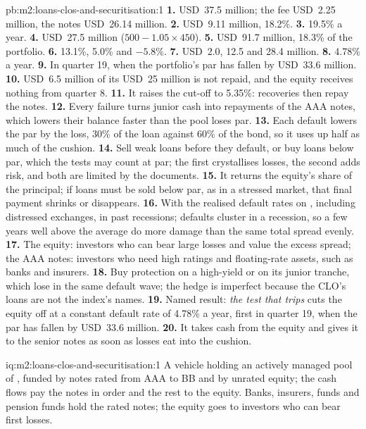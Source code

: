 \begin{solution}{pb:m2:loans-clos-and-securitisation:1}
\textbf{1.} USD~37.5 million; the fee USD~2.25 million, the notes USD~26.14 million.
\textbf{2.} USD~9.11 million, 18.2\%.
\textbf{3.} 19.5\% a year.
\textbf{4.} USD~27.5 million ($500 - 1.05 \times 450$).
\textbf{5.} USD~91.7 million, 18.3\% of the portfolio.
\textbf{6.} 13.1\%, 5.0\% and $-5.8\%$.
\textbf{7.} USD~2.0, 12.5 and 28.4 million.
\textbf{8.} 4.78\% a year.
\textbf{9.} In quarter 19, when the portfolio's par has fallen by USD~33.6 million.
\textbf{10.} USD~6.5 million of its USD~25 million is not repaid, and the equity receives
nothing from quarter 8.
\textbf{11.} It raises the cut-off to 5.35\%: recoveries then repay the notes.
\textbf{12.} Every failure turns junior cash into repayments of the AAA notes, which
lowers their balance faster than the pool loses par.
\textbf{13.} Each default lowers the par by the loss, 30\% of the loan against 60\% of
the bond, so it uses up half as much of the cushion.
\textbf{14.} Sell weak loans before they default, or buy loans below par, which the
tests may count at par; the first crystallises losses, the second adds risk, and
both are limited by the documents.
\textbf{15.} It returns the equity's share of the principal; if loans must be sold
below par, as in a stressed market, that final payment shrinks or disappears.
\textbf{16.} With the realised default rates on , including distressed
exchanges, in past recessions; defaults cluster in a recession, so a few years well
above the average do more damage than the same total spread evenly.
\textbf{17.} The equity: investors who can bear large losses and value the excess
spread; the AAA notes: investors who need high ratings and floating-rate assets, such
as banks and insurers.
\textbf{18.} Buy protection on a high-yield  or on its junior tranche, which
lose in the same default wave; the hedge is imperfect because the CLO's loans are not
the index's names.
\textbf{19.} Named result: \emph{the test that trips} cuts the equity off at a
constant default rate of 4.78\% a year, first in quarter 19, when the par has fallen
by USD~33.6 million.
\textbf{20.} It takes cash from the equity and gives it to the senior notes as soon as
losses eat into the cushion.
\end{solution}

\begin{solution}{iq:m2:loans-clos-and-securitisation:1}
A vehicle holding an actively managed pool of , funded by notes rated
from AAA to BB and by unrated equity; the cash flows pay the notes in order and the
rest to the equity. Banks, insurers, funds and pension funds hold the rated notes; the
equity goes to investors who can bear first losses.
\end{solution}

